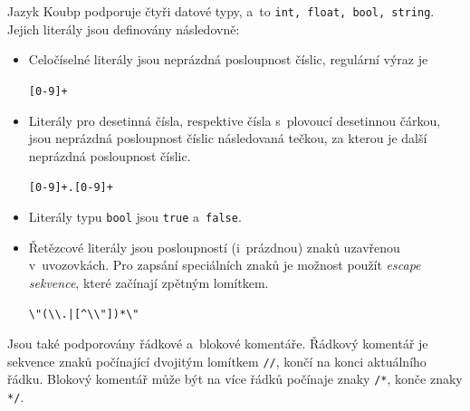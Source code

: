 Jazyk Koubp podporuje čtyři datové typy, a~to \texttt{int, float, bool, string}.
Jejich literály jsou definovány následovně:
\begin{itemize}
    \item Celočíselné literály jsou neprázdná posloupnost číslic, regulární výraz je
    \begin{center}
        \texttt{[0-9]+}
    \end{center} 
    \item Literály pro desetinná čísla, respektive čísla s~plovoucí desetinnou čárkou, jsou neprázdná posloupnost číslic následovaná tečkou, za kterou je další neprázdná posloupnost číslic.
    \begin{center}
        \texttt{[0-9]+.[0-9]+}
    \end{center}
    \item Literály typu \texttt{bool} jsou \texttt{true} a~\texttt{false}.
    \item Řetězcové literály jsou posloupností (i~prázdnou) znaků uzavřenou v~uvozovkách.
    Pro zapsání speciálních znaků je možnost použít \emph{escape sekvence}, které začínají zpětným lomítkem.
    \begin{center}
        \texttt{\textbackslash"(\textbackslash\textbackslash.|[\^{}\textbackslash\textbackslash"])*\textbackslash"}
    \end{center}
\end{itemize}

Jsou také podporovány řádkové a~blokové komentáře.
Řádkový komentář je sekvence znaků počínající dvojitým lomítkem \texttt{//}, končí na konci aktuálního řádku.
Blokový komentář může být na více řádků počínaje znaky \texttt{/*}, konče znaky \texttt{*/}.

